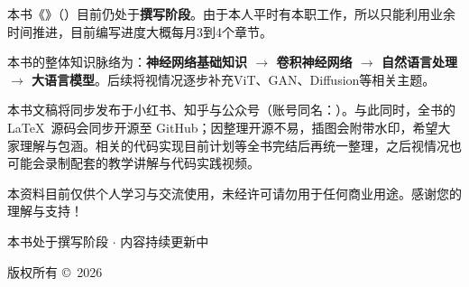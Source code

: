 \begin{titlepage}
    \thispagestyle{empty}
    \setcounter{page}{0}
    
    \centering
    \vspace*{2.5cm}

    \begin{tcolorbox}[
        enhanced,
        width=0.88\textwidth,
        colback=white,
        colframe=purple!75!black,
        boxrule=1pt,
        arc=8pt,
        left=25pt, right=25pt, top=30pt, bottom=25pt,
        title={\Large\bfseries\color{white} 关于本书},
        colbacktitle=purple!85!black,
        attach boxed title to top center={yshift=-4mm},
        boxed title style={sharp corners=south, arc=3pt, boxrule=0.5pt}
    ]
        \centering
        \vspace{0.2cm}
        
        \begin{minipage}{\textwidth}
            \small\color{black!80}
            \setlength{\parskip}{0.85em}
            \setlength{\parindent}{2em}
            
            本书《\@title》（\mySubtitle）目前仍处于\textbf{撰写阶段}。由于本人平时有本职工作，所以只能利用业余时间推进，目前编写进度大概每月3到4个章节。\par
            
            本书的整体知识脉络为：\textbf{神经网络基础知识 $\longrightarrow$ 卷积神经网络 $\longrightarrow$ 自然语言处理 $\longrightarrow$ 大语言模型}。后续将视情况逐步补充ViT、GAN、Diffusion等相关主题。\par
            
            本书文稿将同步发布于小红书、知乎与公众号（账号同名：\@author）。与此同时，全书的 \LaTeX\ 源码会同步开源至 GitHub；因整理开源不易，插图会附带水印，希望大家理解与包涵。相关的代码实现目前计划等全书完结后再统一整理，之后视情况也可能会录制配套的教学讲解与代码实践视频。\par
            
            本资料目前仅供个人学习与交流使用，未经许可请勿用于任何商业用途。感谢您的理解与支持！
        \end{minipage}
    \end{tcolorbox}

    \vfill
    
    {\footnotesize\color{gray}\setlength{\parskip}{0.4em}
        本书处于撰写阶段 $\cdot$ 内容持续更新中 \par
        版权所有 \copyright\ 2026 \@author \par
    }
    \vspace{1cm}
\end{titlepage}

\makeatother
\setcounter{page}{1}
\cleardoublepage
